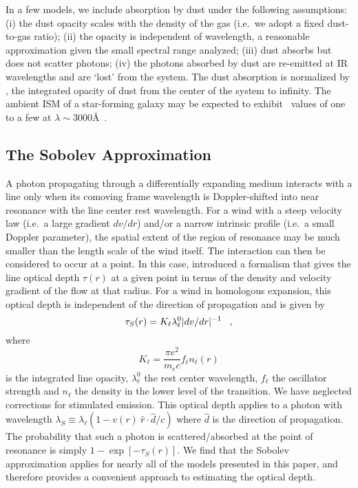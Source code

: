 \documentclass[12pt,preprint]{aastex}
\begin{document}
In a few models, we include absorption by dust under the following
assumptions:
(i) the dust opacity scales with the density of the gas (i.e.\ we
adopt a fixed dust-to-gas ratio);
(ii) the opacity is independent of wavelength, a reasonable
approximation given the small spectral range analyzed;
(iii) dust absorbs but does not scatter photons;
(iv) the photons absorbed by dust are re-emitted at IR wavelengths
and are `lost' from the system.  The dust absorption is normalized by \taud, 
the integrated opacity of dust from the center of the system to
infinity.  The ambient ISM of a star-forming galaxy may be expected to exhibit
\taud\ values of one to a few at $\lambda \sim 3000$\AA\ \citep[e.g.][]{cf00}.

\subsection{The Sobolev Approximation}

A photon propagating through a differentially expanding medium
interacts with a line only when
its comoving frame wavelength is Doppler-shifted into near resonance with the line center rest wavelength. 
For a wind with a steep velocity law  (i.e.\ a large gradient $dv/dr$)
and/or a narrow intrinsic profile (i.e.\ a small Doppler parameter), the 
spatial extent of the region of resonance
may be much smaller than the length scale of the
wind itself.  The interaction can then 
be considered to occur at  a point.
In this case, \citet{sobolev60} introduced a formalism that gives the line optical depth $\tau(r)$ at  
a given point in terms of the density and
velocity gradient of the flow at that radius.  For a wind in homologous expansion,
this optical depth is independent of the direction of propagation and
is given by
\begin{equation}
\tau_S(r) = K_\ell   \lambda^0_\ell | dv/dr |^{-1} \;\;\; ,
\label{eqn:Sobolev}
\end{equation}
where 
\begin{equation}
K_\ell = \frac{\pi e^2}{m_e c} f_\ell n_\ell(r)
\end{equation}
is the integrated line opacity, $\lambda^0_\ell$ the rest center wavelength,
$f_\ell$ the oscillator strength and
$n_\ell$ the density in the lower level of the transition.   We have
neglected corrections for stimulated emission.   This optical
depth applies to a photon with wavelength $\lambda_S
\equiv \lambda_\ell (1- v(r)~\hat{r}  \cdot \hat{d} /c)$ where $\hat{d}$ is the 
direction of propagation.  The probability that such a photon
is scattered/absorbed at the point of resonance is simply $1 - \exp[-\tau_S(r)]$.
We find that the Sobolev approximation applies for nearly all of the
models presented in this paper, and therefore provides a convenient
approach to estimating the optical depth.
\end{document}
